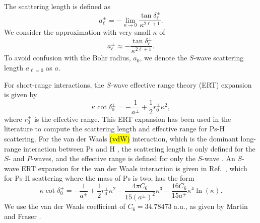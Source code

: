 \documentclass[preprint,showpacs,showkeys,preprintnumbers,amsmath,amssymb,longbibliography,pra,aps]{revtex4-1}
\begin{document}
{The scattering length is defined as \cite{Bransden2003}
\begin{equation}
\label{eq:ScatLen}
a_\ell^\pm = -\lim_{\kappa \to 0}
  \frac{\tan{\delta_\ell^\pm}}{\kappa^{2\ell+1}}.
\end{equation}
We consider the approximation with very small $\kappa$ of
\begin{equation}
\label{eq:ScatLenApprox}
a_\ell^\pm \approx
  - \frac{\tan{\delta_\ell^\pm}}{\kappa^{2\ell+1}}.
\end{equation}
To avoid confusion with the Bohr radius, $a_0$, we denote
the $S$-wave scattering length $a_{\ell=0}$ as $a$.

For short-range interactions, the $S$-wave effective range theory (ERT)
expansion is given by \cite{Bethe1949,Blatt1949}
\begin{equation}
\label{eq:EffectiveRangeShort}
\kappa \cot\delta_0^\pm = -\frac{1}{a^\pm} + \frac{1}{2} r_0^\pm \kappa^2,
\end{equation}
where $r_0^\pm$ is the effective range.
This ERT expansion has been used in the literature
\cite{Ivanov2002,VanReeth2003,Blackwood2002,Walters2004} to compute the
scattering length and effective range for Ps-H scattering. 
For the van der Waals \hl{(vdW)} interaction, which is the dominant long-range
interaction between Ps and H \cite{Fabrikant2014,VanReeth2003,Au1986},
the scattering length is only defined for the $S$- and $P$-waves, and the 
effective range is defined for only the $S$-wave \cite{Levy1963}.
An $S$-wave ERT expansion for the van der Waals interaction is given in
Ref.~\cite{Drake2006}, which for Ps-H scattering where the mass of Ps
is two, has the form
\begin{equation}
\label{eq:EffectiveRangeLongAu}
\kappa \cot\delta_0^\pm = -\frac{1}{a^\pm} + \frac{1}{2} r_0^\pm \kappa^2 - 
  \frac{4 \pi C_6}{15 (a^\pm)^2} \kappa^3 - 
  \frac{16 C_6}{15 a^\pm} \kappa^4 \ln \left(\kappa \right).
\end{equation}
We use the van der Waals coefficient of $C_6 = 34.78473$ a.u., as given
by Martin and Fraser \cite{Martin1980}.

}
\end{document}
